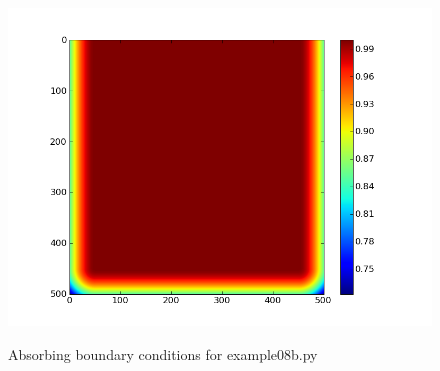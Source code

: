 \begin{figure}[ht]
 \centering
 \includegraphics[width=5in]{figures/ex08babc.png}
 \label{fig:abconds}
 \caption{Absorbing boundary conditions for example08b.py}
\end{figure}

